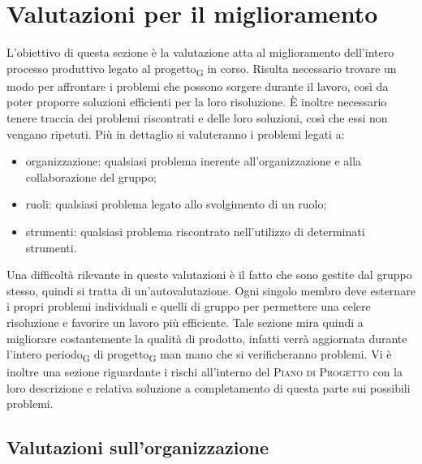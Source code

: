 \section{Valutazioni per il miglioramento}
L'obiettivo di questa sezione è la valutazione atta al miglioramento dell'intero processo produttivo legato al progetto\textsubscript{G} in corso. Risulta necessario trovare un modo per affrontare i problemi che possono sorgere durante il lavoro, così da poter proporre soluzioni efficienti per la loro risoluzione. È inoltre necessario tenere traccia dei problemi riscontrati e delle loro soluzioni, così che essi non vengano ripetuti.
Più in dettaglio si valuteranno i problemi legati a:
\begin{itemize}
    \item organizzazione: qualsiasi problema inerente all'organizzazione e alla collaborazione del gruppo;
    \item ruoli: qualsiasi problema legato allo svolgimento di un ruolo;
    \item strumenti: qualsiasi problema riscontrato nell'utilizzo di determinati strumenti.
\end{itemize}

Una difficoltà rilevante in queste valutazioni è il fatto che sono gestite dal gruppo stesso, quindi si tratta di un'autovalutazione. Ogni singolo membro deve esternare i propri problemi individuali e quelli di gruppo per permettere una celere risoluzione e favorire un lavoro più efficiente.
Tale sezione mira quindi a migliorare costantemente la qualità di prodotto, infatti verrà aggiornata durante l'intero periodo\textsubscript{G} di progetto\textsubscript{G} man mano che si verificheranno problemi.
Vi è inoltre una sezione riguardante i  rischi all'interno del \textsc{Piano di Progetto} con la loro descrizione e relativa soluzione a completamento di questa parte sui possibili problemi.
\pagebreak
\subsection{Valutazioni sull'organizzazione}
